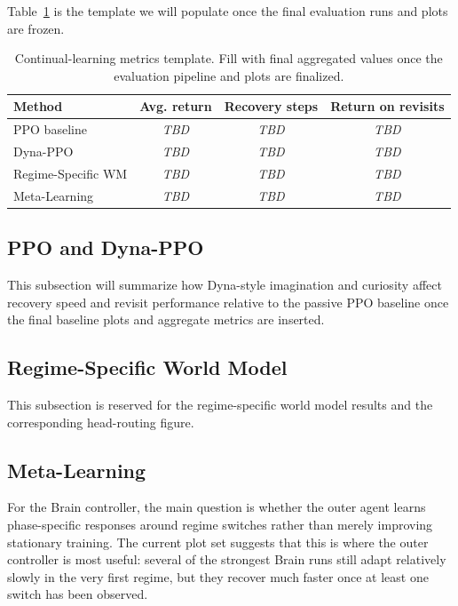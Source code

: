 ﻿\documentclass[sigconf]{acmart}
\begin{document}
Table~\ref{tab:continual_metrics} is the template we will populate once the final evaluation runs and plots are frozen.

\begin{table}[t]
  \caption{Continual-learning metrics template. Fill with final aggregated values once the evaluation pipeline and plots are finalized.}
  \label{tab:continual_metrics}
  \centering
  \begin{tabular}{@{}lccc@{}}
    \toprule
    Method & Avg. return & Recovery steps & Return on revisits \\
    \midrule
    PPO baseline & \textit{TBD} & \textit{TBD} & \textit{TBD} \\
    Dyna-PPO & \textit{TBD} & \textit{TBD} & \textit{TBD} \\
    Regime-Specific WM & \textit{TBD} & \textit{TBD} & \textit{TBD} \\
    Meta-Learning & \textit{TBD} & \textit{TBD} & \textit{TBD} \\
    \bottomrule
  \end{tabular}
\end{table}

\subsection{PPO and Dyna-PPO}
This subsection will summarize how Dyna-style imagination and curiosity affect recovery speed and revisit performance relative to the passive PPO baseline once the final baseline plots and aggregate metrics are inserted.

\subsection{Regime-Specific World Model}
This subsection is reserved for the regime-specific world model results and the corresponding head-routing figure.

\subsection{Meta-Learning}
For the Brain controller, the main question is whether the outer agent learns phase-specific responses around regime switches rather than merely improving stationary training. The current plot set suggests that this is where the outer controller is most useful: several of the strongest Brain runs still adapt relatively slowly in the very first regime, but they recover much faster once at least one switch has been observed.
\end{document}
